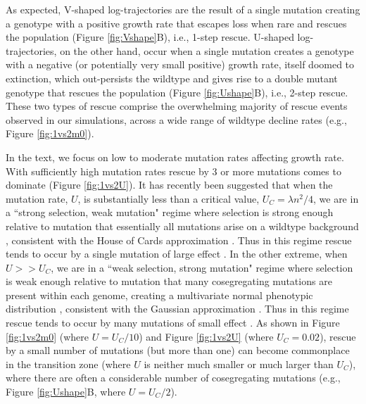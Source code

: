 \documentclass[9pt,twocolumn,twoside,lineno]{gsajnl}
\begin{document}
As expected, V-shaped log-trajectories are the result of a single mutation creating a genotype with a positive growth rate that escapes loss when rare and rescues the population (Figure \ref{fig:Vshape}B), i.e., 1-step rescue.
U-shaped log-trajectories, on the other hand, occur when a single mutation creates a genotype with a negative (or potentially very small positive) growth rate, itself doomed to extinction, which out-persists the wildtype and gives rise to a double mutant genotype that rescues the population (Figure \ref{fig:Ushape}B), i.e., 2-step rescue. 
These two types of rescue comprise the overwhelming majority of rescue events observed in our simulations, across a wide range of wildtype decline rates (e.g., Figure \ref{fig:1vs2m0}).

In the text, we focus on low to moderate mutation rates affecting growth rate.
With sufficiently high mutation rates rescue by 3 or more mutations comes to dominate (Figure \ref{fig:1vs2U}).
It has recently been suggested that when the mutation rate, $U$, is substantially less than a critical value, $U_C = \lambda n^2/4$, we are in a ``strong selection, weak mutation" regime where selection is strong enough relative to mutation that essentially all mutations arise on a wildtype background \citep{martin2016nonstationary}, consistent with the House of Cards approximation \citep{turelli1984heritable,turelli1985effects}.
Thus in this regime rescue tends to occur by a single mutation of large effect \citep{Anciaux2018}.
In the other extreme, when $U>>U_C$, we are in a ``weak selection, strong mutation" regime where selection is weak enough relative to mutation that many cosegregating mutations are present within each genome, creating a multivariate normal phenotypic distribution \citep{martin2016nonstationary}, consistent with the Gaussian approximation \citep{Kimura1965,lande1980genetic}.
Thus in this regime rescue tends to occur by many mutations of small effect \citep{anciaux2019population}.
As shown in Figure \ref{fig:1vs2m0} (where $U = U_C / 10$) and Figure \ref{fig:1vs2U} (where $U_C=0.02$), rescue by a small number of mutations (but more than one) can become commonplace in the transition zone (where $U$ is neither much smaller or much larger than $U_C$), where there are often a considerable number of cosegregating mutations (e.g., Figure \ref{fig:Ushape}B, where $U = U_C/2$).
\end{document}
